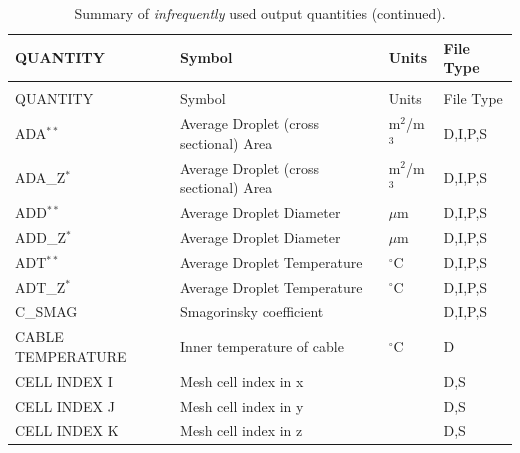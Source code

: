 \documentclass[11pt]{book}
\begin{document}
\begin{longtable}{@{\extracolsep{\fill}}|l|l|l|l|}
\caption[Infrequently used output quantities]{Summary of {\em infrequently} used output quantities.}
\label{tab:oddoutput} \\
\hline
{\ct QUANTITY}                           & Symbol                                        & Units          & File Type    \\
\hline \hline
\endfirsthead
\caption[]{Summary of {\em infrequently} used output quantities (continued).} \\
\hline
{\ct QUANTITY}                           & Symbol                                        & Units          & File Type    \\
\hline \hline
\endhead
{\ct ADA}$^{**}$                                & Average Droplet (cross sectional) Area            & m$^2$/m$^3$    & D,I,P,S      \\ \hline
{\ct ADA\_Z}$^{*}$                              & Average Droplet (cross sectional) Area            & m$^2$/m$^3$    & D,I,P,S      \\ \hline
{\ct ADD}$^{**}$                                & Average Droplet Diameter                          & $\mu$m         & D,I,P,S      \\ \hline
{\ct ADD\_Z}$^{*}$                              & Average Droplet Diameter                          & $\mu$m         & D,I,P,S      \\ \hline
{\ct ADT}$^{**}$                                & Average Droplet Temperature                       & $^\circ$C      & D,I,P,S      \\ \hline
{\ct ADT\_Z}$^{*}$                              & Average Droplet Temperature                       & $^\circ$C      & D,I,P,S      \\ \hline
{\ct C\_SMAG}                                   & Smagorinsky coefficient                           &                & D,I,P,S      \\ \hline
{\ct CABLE TEMPERATURE}                         & Inner temperature of cable                        & $^\circ$C      & D            \\ \hline
{\ct CELL INDEX I}                              & Mesh cell index in x                              &                & D,S          \\ \hline
{\ct CELL INDEX J}                              & Mesh cell index in y                              &                & D,S          \\ \hline
{\ct CELL INDEX K}                              & Mesh cell index in z                              &                & D,S          \\ \hline

\end{longtable}
\end{document}
